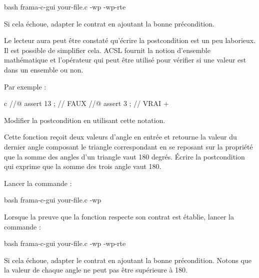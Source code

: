 \begin{CodeBlock}{bash}
frama-c-gui your-file.c -wp -wp-rte
\end{CodeBlock}


Si cela échoue, adapter le contrat en ajoutant la bonne précondition.


Le lecteur aura peut être constaté qu'écrire la postcondition est un peu
laborieux. Il est possible de simplifier cela. ACSL fournit la notion
d'ensemble mathématique et l'opérateur  qui
peut être utilisé pour vérifier si une valeur est dans un ensemble ou non.


Par exemple :

\begin{CodeBlock}{c}
//@ assert 13  ; // FAUX
//@ assert 3   ; // VRAI
+\end{CodeBlock}


Modifier la postcondition en utilisant cette notation.




Cette fonction reçoit deux valeurs d'angle en entrée et retourne
la valeur du dernier angle composant le triangle correspondant en se
reposant sur la propriété que la somme des angles d'un triangle vaut
180 degrés. Écrire la postcondition qui exprime que la somme des trois
angle vaut 180.




Lancer la commande :


\begin{CodeBlock}{bash}
frama-c-gui your-file.c -wp
\end{CodeBlock}


Lorsque la preuve que la fonction respecte son contrat est établie, lancer
la commande :

\begin{CodeBlock}{bash}
frama-c-gui your-file.c -wp -wp-rte
\end{CodeBlock}


Si cela échoue, adapter le contrat en ajoutant la bonne précondition.
Notons que la valeur de chaque angle ne peut pas être supérieure à 180.
